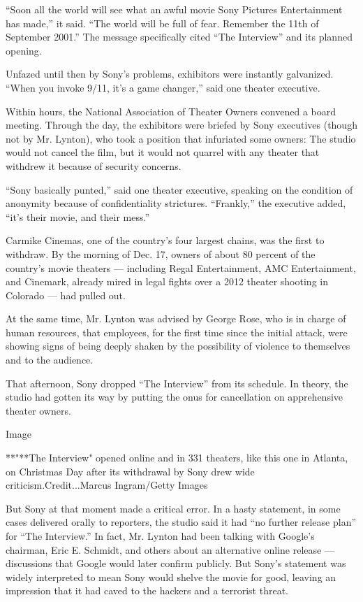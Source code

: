 ``Soon all the world will see what an awful movie Sony Pictures
Entertainment has made,'' it said. ``The world will be full of fear.
Remember the 11th of September 2001.'' The message specifically cited
``The Interview'' and its planned opening.

Unfazed until then by Sony's problems, exhibitors were instantly
galvanized. ``When you invoke 9/11, it's a game changer,'' said one
theater executive.

Within hours, the National Association of Theater Owners convened a
board meeting. Through the day, the exhibitors were briefed by Sony
executives (though not by Mr. Lynton), who took a position that
infuriated some owners: The studio would not cancel the film, but it
would not quarrel with any theater that withdrew it because of security
concerns.

``Sony basically punted,'' said one theater executive, speaking on the
condition of anonymity because of confidentiality strictures.
``Frankly,'' the executive added, ``it's their movie, and their mess.''

Carmike Cinemas, one of the country's four largest chains, was the first
to withdraw. By the morning of Dec. 17, owners of about 80 percent of
the country's movie theaters --- including Regal Entertainment, AMC
Entertainment, and Cinemark, already mired in legal fights over a 2012
theater shooting in Colorado --- had pulled out.

At the same time, Mr. Lynton was advised by George Rose, who is in
charge of human resources, that employees, for the first time since the
initial attack, were showing signs of being deeply shaken by the
possibility of violence to themselves and to the audience.

That afternoon, Sony dropped ``The Interview'' from its schedule. In
theory, the studio had gotten its way by putting the onus for
cancellation on apprehensive theater owners.

Image

**"**The Interview" opened online and in 331 theaters, like this one in
Atlanta, on Christmas Day after its withdrawal by Sony drew wide
criticism.Credit...Marcus Ingram/Getty Images

But Sony at that moment made a critical error. In a hasty statement, in
some cases delivered orally to reporters, the studio said it had ``no
further release plan'' for ``The Interview.'' In fact, Mr. Lynton had
been talking with Google's chairman, Eric E. Schmidt, and others about
an alternative online release --- discussions that Google would later
confirm publicly. But Sony's statement was widely interpreted to mean
Sony would shelve the movie for good, leaving an impression that it had
caved to the hackers and a terrorist threat.

